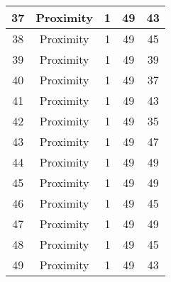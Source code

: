 \documentclass[results.tex]{subfiles}
\begin{document}
\begin{center}
\begin{tabular}{| c || c | c | c | c |}
            \hline
            37                      & Proximity                    & 1                      & 49                      & 43                   \\
            \hline
            38                      & Proximity                    & 1                      & 49                      & 45                   \\
            \hline
            39                      & Proximity                    & 1                      & 49                      & 39                   \\
            \hline
            40                      & Proximity                    & 1                      & 49                      & 37                   \\
            \hline
            41                      & Proximity                    & 1                      & 49                      & 43                   \\
            \hline
            42                      & Proximity                    & 1                      & 49                      & 35                   \\
            \hline
            43                      & Proximity                    & 1                      & 49                      & 47                   \\
            \hline
            44                      & Proximity                    & 1                      & 49                      & 49                   \\
            \hline
            45                      & Proximity                    & 1                      & 49                      & 49                   \\
            \hline
            46                      & Proximity                    & 1                      & 49                      & 45                   \\
            \hline
            47                      & Proximity                    & 1                      & 49                      & 49                   \\
            \hline
            48                      & Proximity                    & 1                      & 49                      & 45                   \\
            \hline
            49                      & Proximity                    & 1                      & 49                      & 43                   \\
            \hline
        \end{tabular}
    \end{center}
\end{document}
